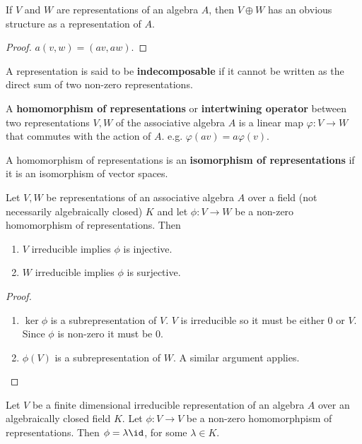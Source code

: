 \documentclass{article}
\begin{document}
\begin{prop}
If $V$ and $W$ are representations of an algebra $A$, then $V \oplus W$ has an
obvious structure as a representation of $A$.
\end{prop}

\begin{proof}
$a (v, w) = (av, aw)$.
\end{proof}

\begin{df}
A representation is said to be \textbf{indecomposable} if it cannot be written
as the direct sum of two non-zero representations.
\end{df}

\begin{df}
A \textbf{homomorphism of representations} or \textbf{intertwining operator}
between two representations $V, W$ of the associative algebra $A$ is a linear
map $\varphi : V \to W$ that commutes with the action of $A$. e.g. $\varphi(av)
= a \varphi(v)$.

A homomorphism of representations is an \textbf{isomorphism of representations}
if it is an isomorphism of vector spaces.
\end{df}

\begin{prop}
Let $V, W$ be representations of an associative algebra $A$ over a field (not
necessarily algebraically closed) $K$ and let $\phi : V \to W$ be a non-zero
homomorphism of representations. Then
\begin{enumerate}
\item
$V$ irreducible implies $\phi$ is injective.
\item
$W$ irreducible implies $\phi$ is surjective.
\end{enumerate}
\end{prop}

\begin{proof}
$ $
\begin{enumerate}
\item
$\ker \phi$ is a subrepresentation of $V$. $V$ is irreducible so it must be
either $0$ or $V$. Since $\phi$ is non-zero it must be $0$.
\item
$\phi(V)$ is a subrepresentation of $W$. A similar argument applies.
\end{enumerate}
\end{proof}

\begin{cor}
Let $V$ be a finite dimensional irreducible representation of an algebra $A$
over an algebraically closed field $K$. Let $\phi : V \to V$ be a non-zero
homomorphpism of representations. Then $\phi = \lambda \id$, for some $\lambda
\in K$.
\end{cor}
\end{document}
